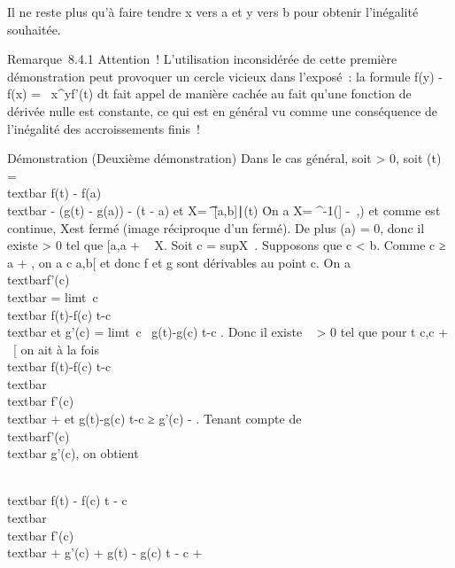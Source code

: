 Il ne reste plus qu'à faire tendre x vers a et y vers b pour obtenir
l'inégalité souhaitée.

Remarque~8.4.1 Attention~! L'utilisation inconsidérée de cette première
démonstration peut provoquer un cercle vicieux dans l'exposé~: la
formule f(y) - f(x) =\int ~
x^yf'(t) dt fait appel de manière cachée au fait qu'une
fonction de dérivée nulle est constante, ce qui est en général vu comme
une conséquence de l'inégalité des accroissements finis~!

Démonstration (Deuxième démonstration) Dans le cas général, soit \epsilon
\textgreater{} 0, soit \phi\epsilon(t) =\\textbar{} f(t)
- f(a)\\textbar{} - (g(t) - g(a)) - \epsilon(t - a) et
X\epsilon = \t \in
{[}a,b{]}∣\phi\epsilon(t) \leq
\epsilon\. On a X\epsilon = \phi\epsilon^-1({]}
-\infty~,\epsilon{]}) et comme \phi\epsilon est continue, X\epsilon est fermé
(image réciproque d'un fermé). De plus \phi\epsilon(a) = 0, donc il
existe \eta \textgreater{} 0 tel que {[}a,a + \eta{]} \subset~ X\epsilon. Soit c
= supX\epsilon~. Supposons que c \textless{}
b. Comme c ≥ a + \eta, on a c \in{]}a,b{[} et donc f et g sont dérivables au
point c. On a \\textbar{}f'(c)\\textbar{}
= limt\rightarrow~c~\\textbar{}
f(t)-f(c) \over t-c \\textbar{} et g'(c)
= limt\rightarrow~c~ g(t)-g(c)
\over t-c . Donc il existe \alpha~ \textgreater{} 0 tel que
pour t \in{]}c,c + \alpha~{[} on ait à la fois \\textbar{}
f(t)-f(c) \over t-c \\textbar{}
\leq\\textbar{} f'(c)\\textbar{} + \epsilon
{} et  g(t)-g(c) \over t-c ≥
g'(c) - \epsilon {} . Tenant compte de
\\textbar{}f'(c)\\textbar{} \leq g'(c), on
obtient

\\textbar{} f(t) - f(c) \over t - c
\\textbar{} \leq\\textbar{}
f'(c)\\textbar{} + \epsilon {} \leq g'(c)
+ \epsilon {} \leq g(t) - g(c) \over t -
c + \epsilon

